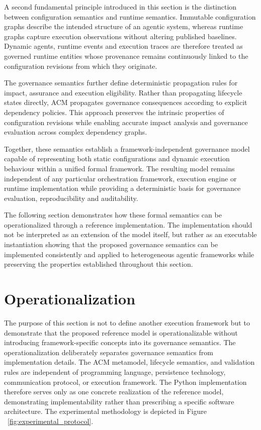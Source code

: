 \documentclass[10pt]{article}
\begin{document}
A second fundamental principle introduced in this section is the distinction
between configuration semantics and runtime semantics. Immutable configuration
graphs describe the intended structure of an agentic system, whereas runtime
graphs capture execution observations without altering published baselines.
Dynamic agents, runtime events and execution traces are therefore treated as
governed runtime entities whose provenance remains continuously linked to the
configuration revisions from which they originate.

The governance semantics further define deterministic propagation rules for
impact, assurance and execution eligibility. Rather than propagating lifecycle
states directly, ACM propagates governance consequences according to explicit
dependency policies. This approach preserves the intrinsic properties of
configuration revisions while enabling accurate impact analysis and governance
evaluation across complex dependency graphs.

Together, these semantics establish a framework-independent governance model
capable of representing both static configurations and dynamic execution
behaviour within a unified formal framework. The resulting model remains
independent of any particular orchestration framework, execution engine or
runtime implementation while providing a deterministic basis for governance
evaluation, reproducibility and auditability.

The following section demonstrates how these formal semantics can be
operationalized through a reference implementation. The implementation should
not be interpreted as an extension of the model itself, but rather as an
executable instantiation showing that the proposed governance semantics can be
implemented consistently and applied to heterogeneous agentic frameworks while
preserving the properties established throughout this section.

\section{Operationalization}
\label{sec:operationalization}

The purpose of this section is not to define another execution framework but to demonstrate that the proposed reference model is operationalizable without introducing framework-specific concepts into its governance semantics. The operationalization deliberately separates governance semantics from implementation details. The ACM metamodel, lifecycle semantics, and validation rules are independent of programming language, persistence technology, communication protocol, or execution framework. The Python implementation therefore serves only as one concrete realization of the reference model, demonstrating implementability rather than prescribing a specific software architecture. The experimental methodology is depicted in Figure ~\ref{fig:experimental_protocol}.
\end{document}
